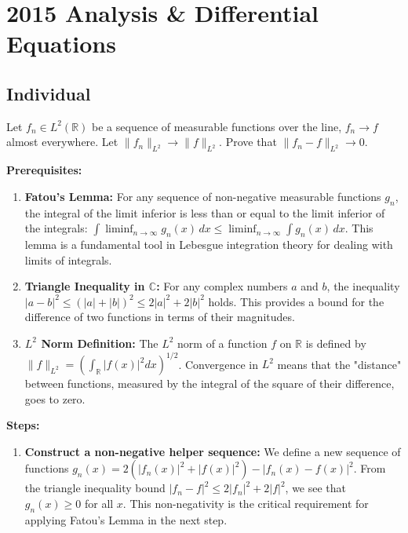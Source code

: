 \section{2015 Analysis \& Differential Equations}

\subsection{Individual}

\begin{exercise}
\label{analysis:2015:1}
Let $f_n\in L^2(\mathbb{R})$ be a sequence of measurable functions over the line, $f_n\to f$ almost everywhere. Let $\|f_n\|_{L^2}\to\|f\|_{L^2}$. Prove that $\|f_n-f\|_{L^2}\to 0$.
\end{exercise}

\begin{solution}
\textbf{Prerequisites:}
\begin{enumerate}
    \item \textbf{Fatou's Lemma:} For any sequence of non-negative measurable functions $g_n$, the integral of the limit inferior is less than or equal to the limit inferior of the integrals: $\int \liminf_{n\to\infty} g_n(x) \, dx \leq \liminf_{n\to\infty} \int g_n(x) \, dx$. This lemma is a fundamental tool in Lebesgue integration theory for dealing with limits of integrals.
    \item \textbf{Triangle Inequality in $\mathbb{C}$:} For any complex numbers $a$ and $b$, the inequality $|a - b|^2 \leq (|a| + |b|)^2 \leq 2|a|^2 + 2|b|^2$ holds. This provides a bound for the difference of two functions in terms of their magnitudes.
    \item \textbf{$L^2$ Norm Definition:} The $L^2$ norm of a function $f$ on $\mathbb{R}$ is defined by $\|f\|_{L^2} = \left(\int_{\mathbb{R}} |f(x)|^2 dx\right)^{1/2}$. Convergence in $L^2$ means that the "distance" between functions, measured by the integral of the square of their difference, goes to zero.
\end{enumerate}

\textbf{Steps:}
\begin{enumerate}
    \item \textbf{Construct a non-negative helper sequence:} We define a new sequence of functions $g_n(x) = 2(|f_n(x)|^2 + |f(x)|^2) - |f_n(x) - f(x)|^2$. 
    From the triangle inequality bound $|f_n - f|^2 \leq 2|f_n|^2 + 2|f|^2$, we see that $g_n(x) \geq 0$ for all $x$. This non-negativity is the critical requirement for applying Fatou's Lemma in the next step.


\end{enumerate}
\end{solution}
